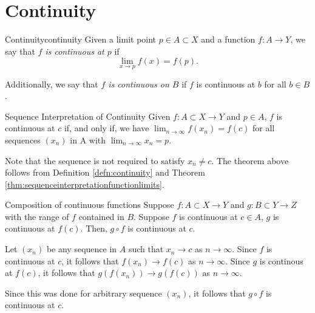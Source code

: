 
\section{Continuity}

\begin{defn}{Continuity}{continuity}
	Given a limit point \(p \in A \subset X\) and a function \(f\colon A \to Y\), we say that \emph{\(f\) is continuous at \(p\)} if \[
		\lim_{x \to p} f(x) = f(p).
	\]

	Additionally, we say that \emph{\(f\) is continuous on \(B\)} if \(f\) is continuous at \(b\) for all \(b \in B\).
\end{defn}

\begin{thm}{Sequence Interpretation of Continuity}{}
	Given \(f \colon A \subset X \to Y\) and \(p \in A\), \(f\) is continuous at \(c\) if, and only if, we have \(\lim_{n\to\infty} f(x_n) = f(c)\) for all sequences \((x_n)\) in A with \(\lim_{n \to \infty} x_n = p\).
\end{thm}

Note that the sequence is not required to satisfy \(x_n \neq c\). The theorem above follows from Definition \ref{defn:continuity} and Theorem \ref{thm:sequenceinterpretationfunctionlimits}.

\begin{thm}{Composition of continuous functions}{}
	Suppose \(f\colon A \subset X \to Y\) and  \(g\colon B \subset Y \to Z\) with the range of \(f\) contained in \(B\). Suppose \(f\) is continuous at \(c \in A\), \(g\) is continuous at \(f(c)\). Then, \(g \circ f\) is continuous at \(c\).
\end{thm}

\begin{dem}{}{}
	Let \((x_n)\) be any sequence in \(A\) such that \(x_n \to c\) as \(n \to \infty\). Since \(f\) is continuous at \(c\), it follows that \(f(x_n) \to f(c)\) as \(n \to \infty\). Since \(g\) is continous at \(f(c)\), it follows that \(g(f(x_n)) \to g(f(c))\) as \(n \to \infty\).

	Since this was done for arbitrary sequence \((x_n)\), it follows that \(g \circ f\) is continuous at \(c\).
\end{dem}
